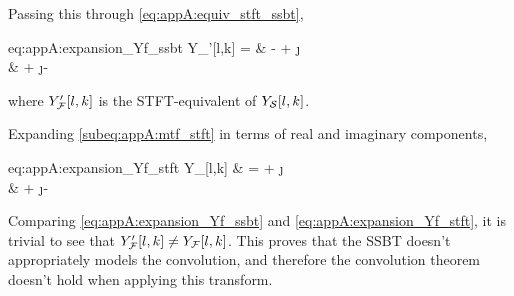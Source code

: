 Passing this through \cref{eq:appA:equiv_stft_ssbt},
\begin{equations}{eq:appA:expansion_Yf_ssbt}
    Y_{\F}'[l,k] =
        & - \xfr[l,k] \hfr[l,k] + \j \xfr[l,k] \hfr[l,k] \\
        & + \j \xfi[l,k] \hfr[l,k] - \xfi[l,k] \hfi[l,k]
\end{equations}
where $Y_{\F}'[l,k]$ is the STFT-equivalent of $Y_{\S}[l,k]$.

Expanding \cref{subeq:appA:mtf_stft} in terms of real and imaginary components,
\begin{equations}{eq:appA:expansion_Yf_stft}
    Y_{\F}[l,k] 
        & = \xfr[l,k] \hfr[l,k] + \j \xfr[l,k] \hfi[l,k] \\
        & + \j \xfi[l,k] \hfr[l,k] - \xfi[l,k] \hfi[l,k]
\end{equations}

Comparing \cref{eq:appA:expansion_Yf_ssbt} and \cref{eq:appA:expansion_Yf_stft}, it is trivial to see that $Y_{\F}'[l,k] \neq Y_{\F}[l,k]$. This proves that the SSBT doesn't appropriately models the convolution, and therefore the convolution theorem doesn't hold when applying this transform.
